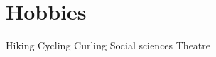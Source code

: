 \documentclass[a4paper]{deedy-resume} %
\begin{document}
\begin{minipage}[t]{0.33\textwidth}
\sectionspace %

\section{Hobbies}

Hiking \textbullet{} Cycling \textbullet{} Curling \textbullet{} Social sciences \textbullet{} Theatre

\sectionspace %


\end{minipage} %
\hfill
%
%
\end{document}
